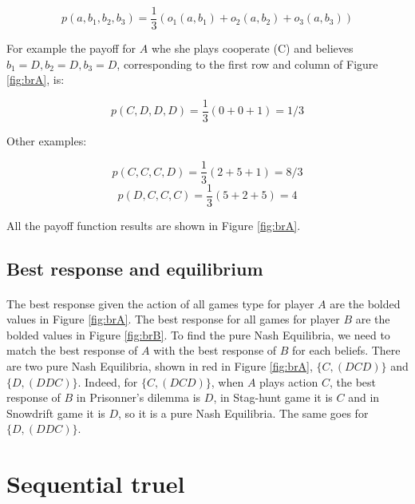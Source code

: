 \documentclass[letterpaper]{article}
\begin{document}
\begin{equation}
 p(a, b_1, b_2, b_3) = \frac{1}{3}(o_1(a, b_1)+o_2(a, b_2)+o_3(a, b_3))
\end{equation}

For example the payoff for $A$ whe she plays cooperate (C) and believes
$b_1 = D, b_2 = D, b_3 = D$,
corresponding to the first row and column of Figure \ref{fig:brA},
is:

\begin{equation}
    p(C, D, D, D) = \frac{1}{3}(0 + 0 + 1) = 1/3
\end{equation}

Other examples:

\begin{equation}
    p(C, C, C, D) = \frac{1}{3}(2 + 5 + 1) = 8/3
\end{equation}
\begin{equation}
    p(D, C, C, C) = \frac{1}{3}(5 + 2 + 5) = 4
\end{equation}

All the payoff function results are shown in Figure \ref{fig:brA}.

\subsection{Best response and equilibrium}

\paragraph{}

The best response given the action of all games type for player $A$ are
the bolded values in
Figure \ref{fig:brA}. The best response for all games for player $B$ are
the bolded values in
Figure \ref{fig:brB}. To find the pure Nash Equilibria, we need to match
the best response of $A$ with the best response of $B$ for each beliefs. There
are two pure Nash Equilibria, shown in red in Figure \ref{fig:brA},
$\{C, (DCD)\}$ and $\{D, (DDC)\}$. Indeed, for $\{C, (DCD)\}$,
when $A$ plays action $C$, the best
response of $B$ in Prisonner's dilemma is $D$, in Stag-hunt game it is $C$ and
in Snowdrift game it is $D$, so it is a pure Nash Equilibria. The same
goes for $\{D, (DDC)\}$.

\section{Sequential truel}

\paragraph{}
\end{document}
